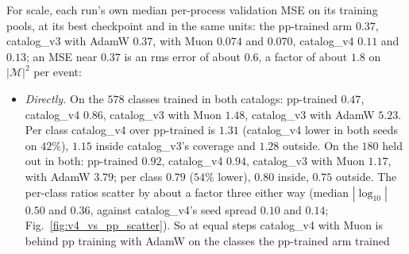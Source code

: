 \documentclass[11pt]{article}
\begin{document}
For scale, each run's own median per-process validation MSE on its training pools, at its best checkpoint and in the
same units: the pp-trained arm $0.37$, catalog\_v3 with AdamW $0.37$, with Muon $0.074$ and $0.070$, catalog\_v4 $0.11$
and $0.13$; an MSE near $0.37$ is an rms error of about $0.6$, a factor of about $1.8$ on $|\mathcal M|^2$ per event:
\begin{itemize}
  \item \emph{Directly.} On the $578$ classes trained in both catalogs: pp-trained $0.47$, catalog\_v4 $0.86$, catalog\_v3
    with Muon $1.48$, catalog\_v3 with AdamW $5.23$. Per class catalog\_v4 over pp-trained is $1.31$ (catalog\_v4 lower
    in both seeds on $42\%$), $1.15$ inside catalog\_v3's coverage and $1.28$ outside. On the $180$ held out in both:
    pp-trained $0.92$, catalog\_v4 $0.94$, catalog\_v3 with Muon $1.17$, with AdamW $3.79$; per class $0.79$ ($54\%$
    lower), $0.80$ inside, $0.75$ outside. The per-class ratios scatter by about a factor three either way (median
    $|\log_{10}|$ $0.50$ and $0.36$, against catalog\_v4's seed spread $0.10$ and $0.14$; Fig.~\ref{fig:v4_vs_pp_scatter}).
    So at equal steps catalog\_v4 with Muon is behind pp training with AdamW on the classes the pp-trained arm trained

\end{itemize}
\end{document}
